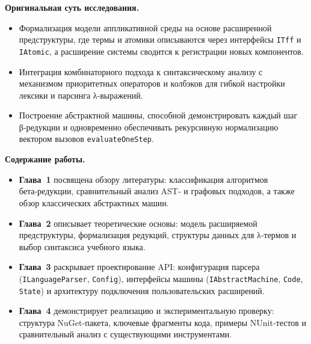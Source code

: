 \textbf{Оригинальная суть исследования.}  
    \begin{itemize}
      \item Формализация модели аппликативной среды на основе расширенной предструктуры, где термы и атомики описываются через интерфейсы \texttt{ITff} и \texttt{IAtomic}, а расширение системы сводится к регистрации новых компонентов.  
      \item Интеграция комбинаторного подхода к синтаксическому анализу с механизмом приоритетных операторов и колбэков для гибкой настройки лексики и парсинга λ‑выражений.  
      \item Построение абстрактной машины, способной демонстрировать каждый шаг β‑редукции и одновременно обеспечивать рекурсивную нормализацию вектором вызовов \texttt{evaluateOneStep}.
    \end{itemize}

\textbf{Содержание работы.}
    \begin{itemize}
      \item \textbf{Глава 1} посвящена обзору литературы: классификация алгоритмов бета‑редукции, сравнительный анализ AST‑ и графовых подходов, а также обзор классических абстрактных машин.  
      \item \textbf{Глава 2} описывает теоретические основы: модель расширяемой предструктуры, формализация редукций, структуры данных для λ‑термов и выбор синтаксиса учебного языка.  
      \item \textbf{Глава 3} раскрывает проектирование API: конфигурация парсера (\texttt{ILanguageParser}, \texttt{Config}), интерфейсы машины (\texttt{IAbstractMachine}, \texttt{Code}, \texttt{State}) и архитектуру подключения пользовательских расширений.  
      \item \textbf{Глава 4} демонстрирует реализацию и экспериментальную проверку: структура NuGet‑пакета, ключевые фрагменты кода, примеры NUnit‑тестов и сравнительный анализ с существующими инструментами.
    \end{itemize}

